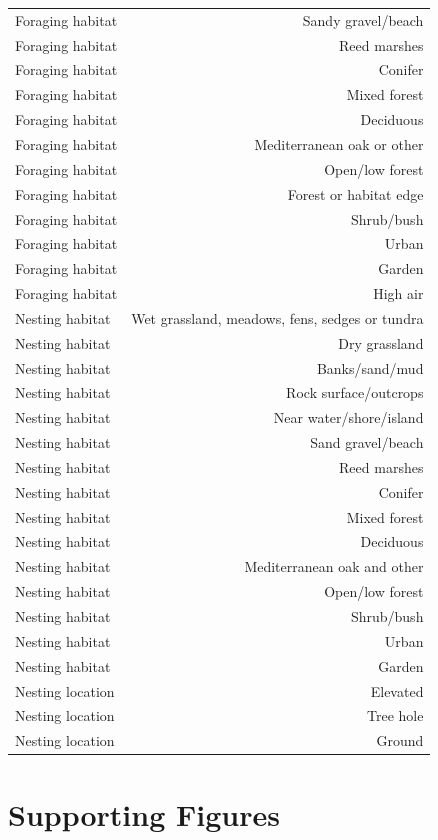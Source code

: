 \begin{landscape}
\begin{longtable}[]{@{}lr@{}}
Foraging habitat & Sandy gravel/beach\tabularnewline
Foraging habitat & Reed marshes\tabularnewline
Foraging habitat & Conifer\tabularnewline
Foraging habitat & Mixed forest\tabularnewline
Foraging habitat & Deciduous\tabularnewline
Foraging habitat & Mediterranean oak or other\tabularnewline
Foraging habitat & Open/low forest\tabularnewline
Foraging habitat & Forest or habitat edge\tabularnewline
Foraging habitat & Shrub/bush\tabularnewline
Foraging habitat & Urban\tabularnewline
Foraging habitat & Garden\tabularnewline
Foraging habitat & High air\tabularnewline
Nesting habitat & Wet grassland, meadows, fens, sedges or
tundra\tabularnewline
Nesting habitat & Dry grassland\tabularnewline
Nesting habitat & Banks/sand/mud\tabularnewline
Nesting habitat & Rock surface/outcrops\tabularnewline
Nesting habitat & Near water/shore/island\tabularnewline
Nesting habitat & Sand gravel/beach\tabularnewline
Nesting habitat & Reed marshes\tabularnewline
Nesting habitat & Conifer\tabularnewline
Nesting habitat & Mixed forest\tabularnewline
Nesting habitat & Deciduous\tabularnewline
Nesting habitat & Mediterranean oak and other\tabularnewline
Nesting habitat & Open/low forest\tabularnewline
Nesting habitat & Shrub/bush\tabularnewline
Nesting habitat & Urban\tabularnewline
Nesting habitat & Garden\tabularnewline
Nesting location & Elevated\tabularnewline
Nesting location & Tree hole\tabularnewline
Nesting location & Ground\tabularnewline
\bottomrule
\end{longtable}

\section{Supporting Figures}\label{supporting-figures}


\end{landscape}



